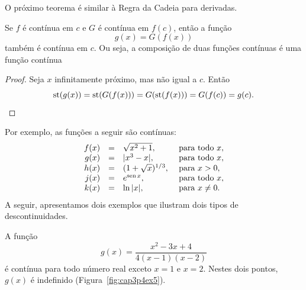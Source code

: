 

O próximo teorema é similar à Regra da Cadeia para derivadas.

\begin{theorem}
  Se $f$ é contínua em $c$ e $G$ é contínua em $f(c)$, então a função
  $$
    g(x) = G(f(x))
  $$
  também é contínua em $c$. Ou seja, a composição de duas funções contínuas
  é uma função contínua
\end{theorem}

\begin{proof}
  Seja $x$ infinitamente próximo, mas não igual a $c$. Então
  $$
    \operatorname{st}(g(x)) = \operatorname{st}(G(f(x))) = G(\operatorname{st}(f(x))) = G(f(c)) = g(c).
  $$
\end{proof}

Por exemplo, as funções a seguir são contínuas:
$$
  \begin{array}{rcl@{\hspace{1em}}l}
    f(x) & = & \sqrt{x^2 + 1}, & \text{ para todo } x, \\
    g(x) & = & |x^3 - x|, & \text{ para todo } x, \\
    h(x) & = & (1 + \sqrt{x})^{1/3}, & \text{ para } x > 0, \\
    j(x) & = & \e^{\sen x}, & \text{ para todo } x, \\
    k(x) & = & \ln|x|, & \text{ para } x \ne 0.
  \end{array}
$$
A seguir, apresentamos dois exemplos que ilustram dois tipos de
descontinuidades.

\begin{example}
  A função
  $$
    g(x) = \frac{x^2 - 3x + 4}{4(x-1)(x-2)}
  $$
  é contínua para todo número real exceto $x = 1$ e $x = 2$. Nestes dois
  pontos, $g(x)$ é indefinido (Figura~\ref{fig:cap3p4ex5}).
\end{example}



